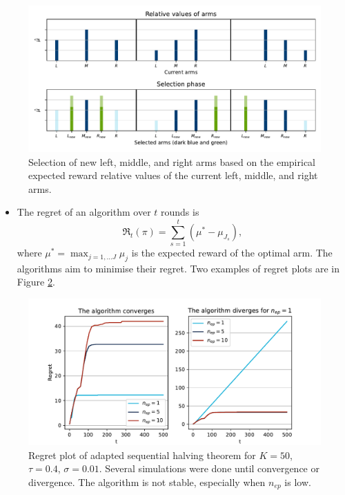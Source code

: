\documentclass[
	landscape, %
]{ImperialPoster}
\begin{document}
\begin{multicols}{4}
	\begin{figure}[H] %
		\includegraphics[width=\linewidth]{"../../../../figures/arm_assignment.pdf"} %
		\caption{Selection of new left, middle, and right arms based on the empirical expected reward relative values of the current left, middle, and right arms.}
		\label{fig:new_arms}
	\end{figure}
	\begin{itemize}
		\item The \textcolor{ICLBlue}{regret} of an algorithm over $t$ rounds is
		$$\mathfrak{R}_t(\pi) = \sum_{s=1}^{t}(\mu^* - \mu_{J_s}),$$
		where $\mu^* = \max_{j = 1, \dots J}\mu_j$ is the expected reward of the optimal arm. The algorithms aim to minimise their regret.
		Two examples of regret plots are in Figure \ref{fig:regret}.
	\end{itemize}
	\begin{figure}[H] %
		\includegraphics[width=\linewidth]{"../../../../figures/regret.pdf"} %
		\caption{Regret plot of adapted sequential halving theorem for $K = 50$, $\tau = 0.4$, $\sigma = 0.01$. Several simulations were done until convergence or divergence. The algorithm is not stable, especially when $n_{ep}$ is low.}
		\label{fig:regret}
	\end{figure}


\end{multicols}
\end{document}
